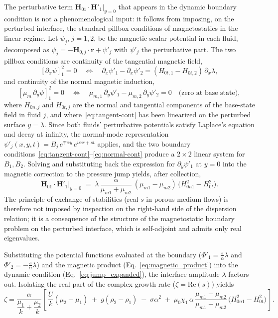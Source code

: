 The perturbative term $\mathbf{H}_{01}\!\cdot\!\mathbf{H}'_1|_{y=0}$ that appears in the dynamic boundary condition is not a phenomenological input: it follows from imposing, on the perturbed interface, the standard pillbox conditions of magnetostatics in the linear regime. Let $\psi_j$, $j = 1, 2$, be the magnetic scalar potential in each fluid, decomposed as $\psi_j = -\mathbf{H}_{0,j}\!\cdot\!\mathbf{r} + \psi'_j$ with $\psi'_j$ the perturbative part. The two pillbox conditions are continuity of the tangential magnetic field,
\begin{equation} \label{eq:tangent-cont}
    [\partial_x \psi]_{1}^{2} = 0
    \quad\Longleftrightarrow\quad
    \partial_x\psi'_1 - \partial_x\psi'_2 = (H_{0t,1} - H_{0t,2})\,\partial_x\lambda,
\end{equation}
and continuity of the normal magnetic induction,
\begin{equation} \label{eq:normal-cont}
    [\mu_m\,\partial_y \psi]_{1}^{2} = 0
    \quad\Longleftrightarrow\quad
    \mu_{m,1}\,\partial_y\psi'_1 - \mu_{m,2}\,\partial_y\psi'_2 = 0
    \quad\text{(zero at base state)},
\end{equation}
where $H_{0n,j}$ and $H_{0t,j}$ are the normal and tangential components of the base-state field in fluid $j$, and where~\eqref{eq:tangent-cont} has been linearized on the perturbed surface $y = \lambda$. Since both fluids' perturbative potentials satisfy Laplace's equation and decay at infinity, the normal-mode representation $\psi'_j(x,y,t) = B_j\,e^{\mp\alpha y}\,e^{i\alpha x + st}$ applies, and the two boundary conditions~\eqref{eq:tangent-cont}--\eqref{eq:normal-cont} produce a $2\times 2$ linear system for $B_1, B_2$. Solving and substituting back the expression for $\partial_y\psi'_1$ at $y = 0$ into the magnetic correction to the pressure jump yields, after collection,
\begin{equation} \label{eq:magnetic_product}
    \mathbf{H}_{01}\!\cdot\!\mathbf{H}'_1\Big|_{y=0}
    \;=\; \lambda\,\frac{\alpha}{\mu_{m1} + \mu_{m2}}\,
    (\mu_{m1} - \mu_{m2})\,\bigl(H_{0n1}^{2} - H_{0t}^{2}\bigr).
\end{equation}
The principle of exchange of stabilities (real $s$ in porous-medium flows) is therefore not imposed by inspection on the right-hand side of the dispersion relation; it is a consequence of the structure of the magnetostatic boundary problem on the perturbed interface, which is self-adjoint and admits only real eigenvalues.

Substituting the potential functions evaluated at the boundary ($\Phi'_1 = \frac{s}{\alpha}\lambda$ and $\Phi'_2 = -\frac{s}{\alpha}\lambda$) and the magnetic product (Eq.~\ref{eq:magnetic_product}) into the dynamic condition (Eq.~\ref{eq:jump_expanded}), the interface amplitude $\lambda$ factors out. Isolating the real part of the complex growth rate ($\zeta = \mathrm{Re}(s)$) yields
\begin{equation} \label{eq:disp_mag_dim}
    \zeta = \frac{\alpha}{\dfrac{\mu_1}{k} + \dfrac{\mu_2}{k}}
    \left[\, \frac{U}{k}(\mu_2 - \mu_1) \;+\; g(\rho_2 - \rho_1) \;-\; \sigma \alpha^2
    \;+\; \mu_0 \chi_1\, \alpha\, \frac{\mu_{m1} - \mu_{m2}}{\mu_{m1} + \mu_{m2}}\, \bigl( H_{0n1}^2 - H_{0t}^2 \bigr) \,\right].
\end{equation}


